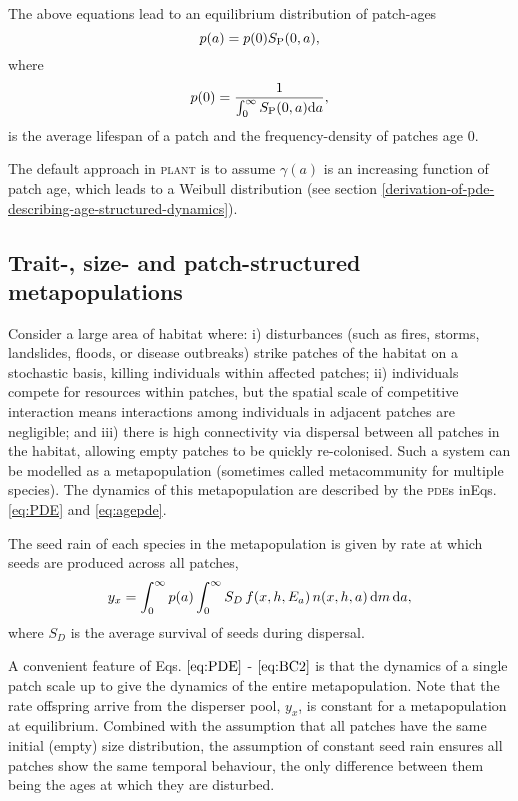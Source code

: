 \documentclass[10pt,twoside]{article}
\newcommand{\plant}{\textsc{plant}}
\begin{document}
The above equations lead to an equilibrium distribution of patch-ages
\begin{equation} p(a) = p(0) S_{\rm P} (0,a),
\end{equation}
where
\begin{equation}
  p(0) = \frac1{\int_0^\infty S_{\rm P} (0,a) {\rm d}a},
\end{equation}
is the average lifespan of a patch and the frequency-density of patches
age \(0\).

The default approach in {\plant} is to assume  $\gamma(a)$ is an
increasing function of patch age, which leads to a Weibull distribution
(see section \ref{derivation-of-pde-describing-age-structured-dynamics}).

\subsection{Trait-, size- and patch-structured
metapopulations}\label{trait--size--and-patch-structured-metapopulations}

Consider a large area of habitat where: i) disturbances (such as fires,
storms, landslides, floods, or disease outbreaks) strike patches of the
habitat on a stochastic basis, killing individuals within affected
patches; ii) individuals compete for resources within patches, but the
spatial scale of competitive interaction means interactions among
individuals in adjacent patches are negligible; and iii) there is high
connectivity via dispersal between all patches in the habitat, allowing
empty patches to be quickly re-colonised. Such a system can be modelled
as a metapopulation (sometimes called metacommunity for multiple
species). The dynamics of this metapopulation are described by the 
\textsc{pde}s inEqs. \ref{eq:PDE} and  \ref{eq:agepde}.

The seed rain of each species in the metapopulation is given by rate at
which seeds are produced across all patches,
\begin{equation}  \label{eq:seed_rain} 
  y_x = \int_0^{\infty} p(a)  \int_0^{\infty}  S_D \, f(x,h,E_a) \, n(x,h,a)\,{\rm d} m \, {\rm d} a,
\end{equation}
where \(S_D\) is the average survival of seeds during dispersal.

A convenient feature of Eqs. \(\ref{eq:PDE}\) - \(\ref{eq:BC2}\) is that
the dynamics of a single patch scale up to give the dynamics of the
entire metapopulation. Note that the rate offspring arrive from the
disperser pool, \(y_x\), is constant for a metapopulation at
equilibrium. Combined with the assumption that all patches have the same
initial (empty) size distribution, the assumption of constant seed rain
ensures all patches show the same temporal behaviour, the only
difference between them being the ages at which they are disturbed.
\end{document}

